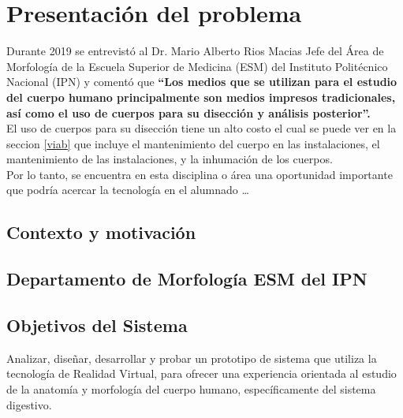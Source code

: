 \chapter{Presentación del problema}
Durante 2019 se entrevistó al Dr. Mario Alberto Rios Macias Jefe del Área de Morfología de la Escuela Superior de Medicina (ESM) 
del Instituto Politécnico Nacional (IPN) y comentó que \textbf{“Los medios que se utilizan para el estudio del cuerpo humano principalmente 
son medios impresos tradicionales, así como el uso de cuerpos para su disección y análisis posterior”.}\\
El uso de cuerpos para su disección tiene un alto costo el cual se puede ver en la seccion \ref{viab}
que incluye el mantenimiento del cuerpo en las instalaciones, el mantenimiento de las instalaciones, y la inhumación de los cuerpos.\\
Por lo tanto, se encuentra en esta disciplina o área una oportunidad importante que podría acercar la tecnología en el alumnado … 

\section{Contexto y motivación}

\section{Departamento de Morfología ESM del IPN}

\section{Objetivos del Sistema}
Analizar, diseñar, desarrollar y probar un prototipo de sistema que utiliza la tecnología de Realidad Virtual, para ofrecer una experiencia orientada al estudio 
de la anatomía y morfología del cuerpo humano, específicamente del sistema digestivo.\\
